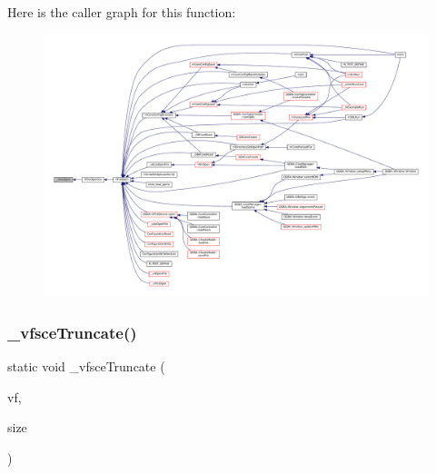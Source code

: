 Here is the caller graph for this function\+:
\nopagebreak
\begin{figure}[H]
\begin{center}
\leavevmode
\includegraphics[width=350pt]{sce-vfs_8c_a2e5832acdb13477bec265326bc727547_icgraph}
\end{center}
\end{figure}
\mbox{\label{sce-vfs_8c_a2d93895f44e1589f7f3e3a2aa6850b08}} 
\subsubsection{\texorpdfstring{\+\_\+vfsce\+Truncate()}{\_vfsceTruncate()}}
{\footnotesize\ttfamily static void \+\_\+vfsce\+Truncate (\begin{DoxyParamCaption}\item[{struct V\+File $\ast$}]{vf,  }\item[{size\+\_\+t}]{size }\end{DoxyParamCaption})\hspace{0.3cm}{\ttfamily [static]}}


